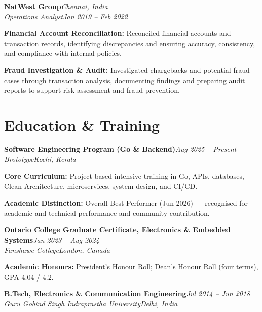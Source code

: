 \documentclass[10pt,a4paper]{article}
\begin{document}
\vspace{8pt}

\noindent\textbf{NatWest Group}\hfill\textit{Chennai, India}\\[1.5pt]
\noindent\textit{Operations Analyst}\hfill\textit{Jan 2019 -- Feb 2022}
\begin{resumelist}
  \item \textbf{Financial Account Reconciliation:} Reconciled financial accounts and transaction records, identifying discrepancies and ensuring accuracy, consistency, and compliance with internal policies.
  \item \textbf{Fraud Investigation \& Audit:} Investigated chargebacks and potential fraud cases through transaction analysis, documenting findings and preparing audit reports to support risk assessment and fraud prevention.
\end{resumelist}

\section*{Education \& Training}

\noindent\textbf{Software Engineering Program (Go \& Backend)}\hfill\textit{Aug 2025 -- Present}\\[1.5pt]
\noindent\textit{Brototype}\hfill\textit{Kochi, Kerala}
\begin{resumelist}
  \item \textbf{Core Curriculum:} Project-based intensive training in Go, APIs, databases, Clean Architecture, microservices, system design, and CI/CD.
  \item \textbf{Academic Distinction:} Overall Best Performer (Jun 2026) --- recognised for academic and technical performance and community contribution.
\end{resumelist}

\vspace{8pt}

\noindent\textbf{Ontario College Graduate Certificate, Electronics \& Embedded Systems}\hfill\textit{Jan 2023 -- Aug 2024}\\[1.5pt]
\noindent\textit{Fanshawe College}\hfill\textit{London, Canada}
\begin{resumelist}
  \item \textbf{Academic Honours:} President's Honour Roll; Dean's Honour Roll (four terms), GPA 4.04 / 4.2.
\end{resumelist}

\vspace{8pt}

\noindent\textbf{B.Tech, Electronics \& Communication Engineering}\hfill\textit{Jul 2014 -- Jun 2018}\\[1.5pt]
\noindent\textit{Guru Gobind Singh Indraprastha University}\hfill\textit{Delhi, India}
\end{document}
